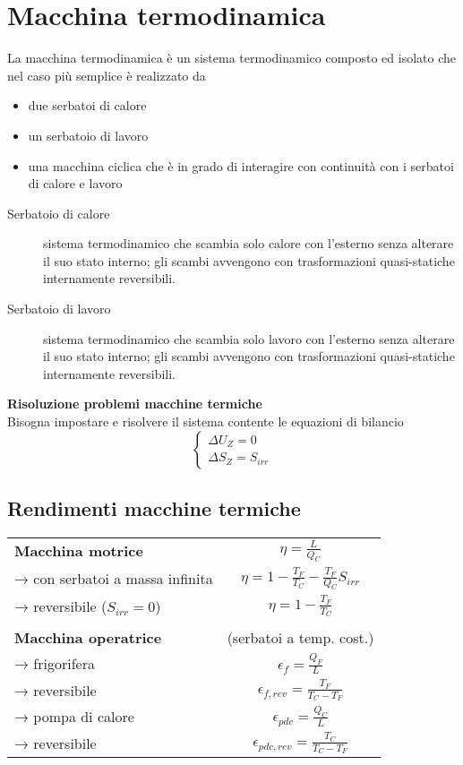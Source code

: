 \section{Macchina termodinamica}
La macchina termodinamica è un sistema termodinamico composto ed isolato che nel caso più semplice è realizzato da
\begin{itemize}
\item due serbatoi di calore
\item un serbatoio di lavoro
\item una macchina ciclica che è in grado di interagire con continuità con i serbatoi di calore e lavoro
\end{itemize}

\begin{description}
\item[Serbatoio di calore]
sistema termodinamico che scambia solo calore con l'esterno senza alterare il suo stato interno;
gli scambi avvengono con trasformazioni quasi-statiche internamente reversibili.
\item[Serbatoio di lavoro]
sistema termodinamico che scambia solo lavoro con l'esterno senza alterare il suo stato interno;
gli scambi avvengono con trasformazioni quasi-statiche internamente reversibili.
\end{description}

\textbf{Risoluzione problemi macchine termiche}\\
Bisogna impostare e risolvere il sistema contente le equazioni di bilancio
\[
    \begin{cases}
    \Delta U_Z = 0 \\
    \Delta S_Z = S_{irr}
    \end{cases}
\]

\subsection{Rendimenti macchine termiche}
{\renewcommand{\arraystretch}{1.5}
\begin{tabular}{p{4cm}c}
\textbf{Macchina motrice} & $\eta = \frac{L}{Q_C}$ \\
→ con serbatoi a massa infinita & $\eta = 1 - \frac{T_F}{T_C} - \frac{T_F}{Q_C}S_{irr}$ \\
\phantom{→}→ reversibile ($S_{irr} = 0$) & $\eta = 1 - \frac{T_F}{T_C}$ \\
\\
\textbf{Macchina operatrice} & (serbatoi a temp. cost.) \\
→ frigorifera & $\epsilon_f = \frac{Q_F}{L}$ \\
\phantom{→}→ reversibile & $\epsilon_{f,rev} = \frac{T_F}{T_C - T_F}$ \\
→ pompa di calore & $\epsilon_{pdc} = \frac{Q_C}{L}$ \\
\phantom{→}→ reversibile & $\epsilon_{pdc,rev} = \frac{T_C}{T_C - T_F}$ \\
\end{tabular}
}

